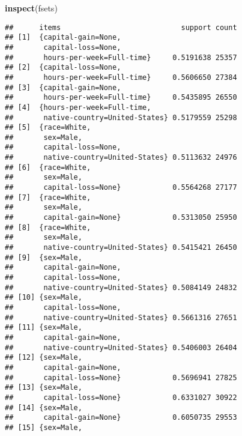 \documentclass[]{article}
\newenvironment{Shaded}{\begin{snugshade}}{\end{snugshade}}
\newcommand{\KeywordTok}[1]{\textcolor[rgb]{0.13,0.29,0.53}{\textbf{#1}}}
\newcommand{\NormalTok}[1]{#1}
\begin{document}
\begin{Shaded}
\begin{Highlighting}[]
\KeywordTok{inspect}\NormalTok{(fsets)}
\end{Highlighting}
\end{Shaded}

\begin{verbatim}
##      items                            support count
## [1]  {capital-gain=None,                           
##       capital-loss=None,                           
##       hours-per-week=Full-time}     0.5191638 25357
## [2]  {capital-loss=None,                           
##       hours-per-week=Full-time}     0.5606650 27384
## [3]  {capital-gain=None,                           
##       hours-per-week=Full-time}     0.5435895 26550
## [4]  {hours-per-week=Full-time,                    
##       native-country=United-States} 0.5179559 25298
## [5]  {race=White,                                  
##       sex=Male,                                    
##       capital-loss=None,                           
##       native-country=United-States} 0.5113632 24976
## [6]  {race=White,                                  
##       sex=Male,                                    
##       capital-loss=None}            0.5564268 27177
## [7]  {race=White,                                  
##       sex=Male,                                    
##       capital-gain=None}            0.5313050 25950
## [8]  {race=White,                                  
##       sex=Male,                                    
##       native-country=United-States} 0.5415421 26450
## [9]  {sex=Male,                                    
##       capital-gain=None,                           
##       capital-loss=None,                           
##       native-country=United-States} 0.5084149 24832
## [10] {sex=Male,                                    
##       capital-loss=None,                           
##       native-country=United-States} 0.5661316 27651
## [11] {sex=Male,                                    
##       capital-gain=None,                           
##       native-country=United-States} 0.5406003 26404
## [12] {sex=Male,                                    
##       capital-gain=None,                           
##       capital-loss=None}            0.5696941 27825
## [13] {sex=Male,                                    
##       capital-loss=None}            0.6331027 30922
## [14] {sex=Male,                                    
##       capital-gain=None}            0.6050735 29553
## [15] {sex=Male,                                    

\end{verbatim}
\end{document}
